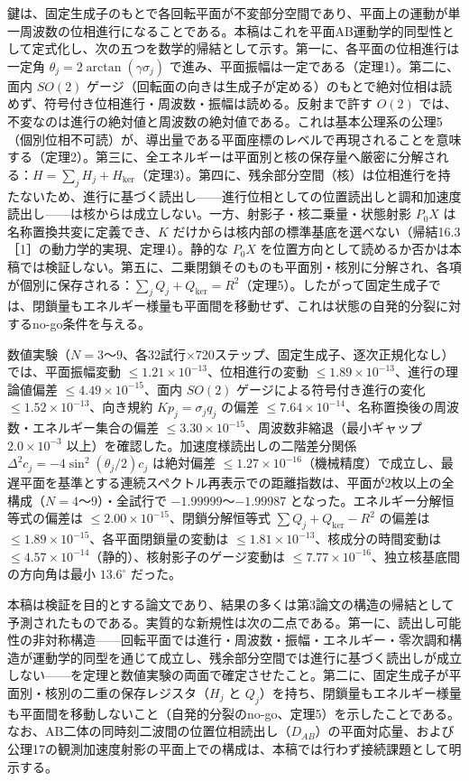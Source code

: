 \documentclass[
  a4paper,
]{ltjsarticle}
\begin{document}
鍵は、固定生成子のもとで各回転平面が不変部分空間であり、平面上の運動が単一周波数の位相進行になることである。本稿はこれを平面AB運動学的同型性として定式化し、次の五つを数学的帰結として示す。第一に、各平面の位相進行は一定角
\(\theta_j=2\arctan(\gamma\sigma_j)\)
で進み、平面振幅は一定である（定理1）。第二に、面内 \(SO(2)\)
ゲージ（回転面の向きは生成子が定める）のもとで絶対位相は読めず、符号付き位相進行・周波数・振幅は読める。反射まで許す
\(O(2)\)
では、不変なのは進行の絶対値と周波数の絶対値である。これは基本公理系の公理5（個別位相不可読）が、導出量である平面座標のレベルで再現されることを意味する（定理2）。第三に、全エネルギーは平面別と核の保存量へ厳密に分解される：\(H=\sum_j H_j+H_{\ker}\)（定理3）。第四に、残余部分空間（核）は位相進行を持たないため、進行に基づく読出し------進行位相としての位置読出しと調和加速度読出し------は核からは成立しない。一方、射影子・核二乗量・状態射影
\(P_0X\) は名称置換共変に定義でき、\(K\)
だけからは核内部の標準基底を選べない（帰結16.3［1］の動力学的実現、定理4）。静的な
\(P_0X\)
を位置方向として読めるか否かは本稿では検証しない。第五に、二乗閉鎖そのものも平面別・核別に分解され、各項が個別に保存される：\(\sum_jQ_j+Q_{\ker}=R^2\)（定理5）。したがって固定生成子では、閉鎖量もエネルギー様量も平面間を移動せず、これは状態の自発的分裂に対するno-go条件を与える。

数値実験（\(N=3\)〜\(9\)、各32試行×720ステップ、固定生成子、逐次正規化なし）では、平面振幅変動
\(\le1.21\times10^{-13}\)、位相進行の変動
\(\le1.89\times10^{-13}\)、進行の理論値偏差
\(\le4.49\times10^{-15}\)、面内 \(SO(2)\) ゲージによる符号付き進行の変化
\(\le1.52\times10^{-13}\)、向き規約 \(Kp_j=\sigma_jq_j\) の偏差
\(\le7.64\times10^{-14}\)、名称置換後の周波数・エネルギー集合の偏差
\(\le3.30\times10^{-15}\)、周波数非縮退（最小ギャップ
\(2.0\times10^{-3}\) 以上）を確認した。加速度様読出しの二階差分関係
\(\Delta^2c_j=-4\sin^2(\theta_j/2)c_j\) は絶対偏差
\(\le1.27\times10^{-16}\)（機械精度）で成立し、最遅平面を基準とする連続スペクトル再表示での距離指数は、平面が2枚以上の全構成（\(N=4\)〜\(9\)）・全試行で
\(-1.99999\)〜\(-1.99987\) となった。エネルギー分解恒等式の偏差は
\(\le2.00\times10^{-15}\)、閉鎖分解恒等式 \(\sum Q_j+Q_{\ker}-R^2\)
の偏差は \(\le1.89\times10^{-15}\)、各平面閉鎖量の変動は
\(\le1.81\times10^{-13}\)、核成分の時間変動は
\(\le4.57\times10^{-14}\)（静的）、核射影子のゲージ変動は
\(\le7.77\times10^{-16}\)、独立核基底間の方向角は最小 \(13.6^\circ\)
だった。

本稿は検証を目的とする論文であり、結果の多くは第3論文の構造の帰結として予測されたものである。実質的な新規性は次の二点である。第一に、読出し可能性の非対称構造------回転平面では進行・周波数・振幅・エネルギー・零次調和構造が運動学的同型を通じて成立し、残余部分空間では進行に基づく読出しが成立しない------を定理と数値実験の両面で確定させたこと。第二に、固定生成子が平面別・核別の二重の保存レジスタ（\(H_j\)
と
\(Q_j\)）を持ち、閉鎖量もエネルギー様量も平面間を移動しないこと（自発的分裂のno-go、定理5）を示したことである。なお、AB二体の同時刻二波間の位置位相読出し（\(D_{AB}\)）の平面対応量、および公理17の観測加速度射影の平面上での構成は、本稿では行わず接続課題として明示する。
\end{document}
